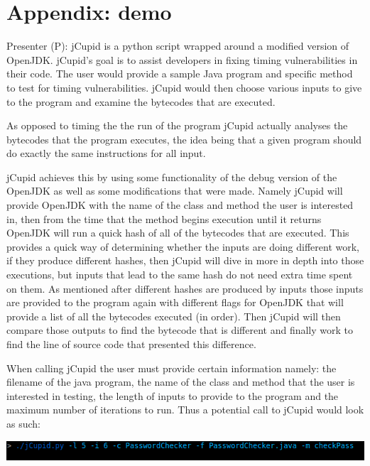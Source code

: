 
\section{Appendix: \jcupid demo}

Presenter (P): jCupid is a python script wrapped around a modified version of OpenJDK. jCupid's goal
is to assist developers in fixing timing vulnerabilities in their code. The user would provide a sample
Java program and specific method to test for timing vulnerabilities. jCupid would then choose various
inputs to give to the program and examine the bytecodes that are executed.

As opposed to timing the the run of the program jCupid actually analyses the bytecodes that the program
executes, the idea being that a given program should do exactly the same instructions for all input.

jCupid achieves this by using some functionality of the debug version of the OpenJDK as well as some
modifications that were made. Namely jCupid will provide OpenJDK with the name of the class and method
the user is interested in, then from the time that the method begins execution until it returns OpenJDK
will run a quick hash of all of the bytecodes that are executed. This provides a quick way of determining
whether the inputs are doing different work, if they produce different hashes, then jCupid will dive 
in more in depth into those executions, but inputs that lead to the same hash do not need extra time
spent on them. As mentioned after different hashes are produced by inputs those inputs are provided
to the program again with different flags for OpenJDK that will provide a list of all the bytecodes 
executed (in order). Then jCupid will then compare those outputs to find the bytecode that is different
and finally work to find the line of source code that presented this difference.

When calling jCupid the user must provide certain information namely: the filename of the java program,
the name of the class and method that the user is interested in testing, the length of inputs to provide
to the program and the maximum number of iterations to run. Thus a potential call to jCupid would look
as such:

\begin{center}
  \includegraphics[width=\linewidth]{jCupidCall}
\end{center}

